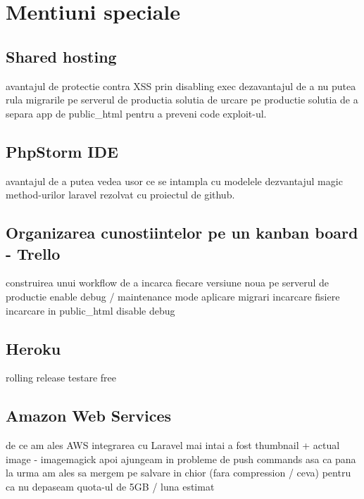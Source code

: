 \section{Mentiuni speciale}
	\subsection{Shared hosting}
		avantajul de protectie contra XSS prin disabling exec
		dezavantajul de a nu putea rula migrarile pe serverul de productia
		solutia de urcare pe productie
		solutia de a separa app de public\_html pentru a preveni code exploit-ul.
	\subsection{PhpStorm IDE}
		avantajul de a putea vedea usor ce se intampla cu modelele
		dezvantajul magic method-urilor laravel rezolvat cu proiectul de github.
	\subsection{Organizarea cunostiintelor pe un kanban board - Trello}
		construirea unui workflow de a incarca fiecare versiune noua pe serverul de productie
			enable debug / maintenance mode
			aplicare migrari
			incarcare fisiere
			incarcare in public\_html
			disable debug
	\subsection{Heroku}
		rolling release
		testare
		free
	\subsection{Amazon Web Services}
		de ce am ales AWS
		integrarea cu Laravel
		mai intai a fost thumbnail + actual image - imagemagick
		apoi ajungeam in probleme de push commands
		asa ca pana la urma am ales sa mergem pe salvare in chior (fara compression / ceva)
			pentru ca nu depaseam quota-ul de 5GB / luna estimat